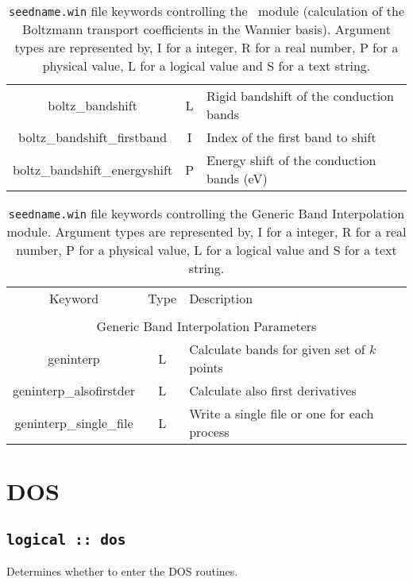 \begin{table}[hH!]
\begin{center}
\begin{tabular}{|c|c|p{6cm}|}
{\sc boltz\_bandshift} & L & Rigid bandshift of the conduction bands\\
{\sc boltz\_bandshift\_firstband} & I & Index of the first band to shift\\
{\sc boltz\_bandshift\_energyshift} & P & Energy shift of the conduction bands (eV)\\
\hline
\end{tabular}
\caption[Parameter file keywords controlling the \bw\ module.]
{{\tt seedname.win} file keywords controlling the \bw\ module (calculation of the Boltzmann transport coefficients in the Wannier basis). Argument types
are represented by, I for a integer, R for a real number, P for a
physical value, L for a logical value and S for a text string.}
\label{parameter_keywords_bw}
\end{center}
\end{table}

\begin{table}[hH!]
\begin{center}
\begin{tabular}{|c|c|p{6cm}|}
\hline
Keyword & Type & Description \\
        &      &             \\
\hline\hline
\multicolumn{3}{|c|}{Generic Band Interpolation Parameters} \\
\hline
{\sc geninterp}   & L & Calculate bands for given set of $k$ points \\
{\sc geninterp\_alsofirstder} & L & Calculate also first derivatives\\ 
{\sc geninterp\_single\_file} & L & Write a single file or one for each
process\\ 
\hline
\end{tabular}
\caption[Parameter file keywords controlling the Generic Band Interpolation module.]
{{\tt seedname.win} file keywords controlling the Generic Band Interpolation module. Argument types
are represented by, I for a integer, R for a real number, P for a
physical value, L for a logical value and S for a text string.}
\label{parameter_keywords_geninterp}
\end{center}
\end{table}

\clearpage
\section{DOS}
\subsection[dos]{\tt logical :: dos}
Determines whether to enter the DOS routines.


